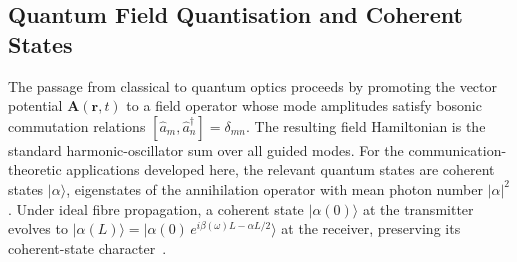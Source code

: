 \documentclass[journal,twocolumn]{IEEEtran}
\theoremstyle{definition}
\theoremstyle{plain}
\begin{document}
\subsection{Quantum Field Quantisation and Coherent States}

The passage from classical to quantum optics proceeds by promoting
the vector potential $\mathbf{A}(\mathbf{r},t)$ to a field operator
whose mode amplitudes satisfy bosonic commutation relations
$[\hat{a}_m, \hat{a}_n^\dagger] = \delta_{mn}$.  The resulting
field Hamiltonian is the standard harmonic-oscillator sum over all
guided modes.  For the communication-theoretic applications developed
here, the relevant quantum states are coherent states
$|\alpha\rangle$, eigenstates of the annihilation operator with mean
photon number $|\alpha|^2$.  Under ideal fibre propagation, a coherent
state $|\alpha(0)\rangle$ at the transmitter evolves to
$|\alpha(L)\rangle = |\alpha(0)\,e^{i\beta(\omega)L - \alpha L/2}\rangle$
at the receiver, preserving its coherent-state character~\cite{loudon2000,kok2010}.
\end{document}
